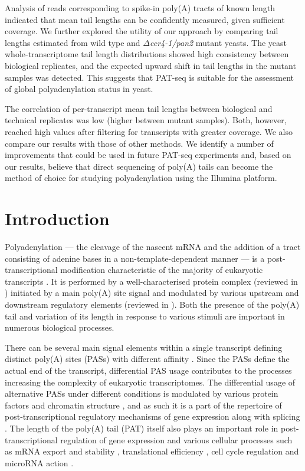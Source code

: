 \documentclass[10pt]{article}
\begin{document}
Analysis of reads corresponding to spike-in poly(A) tracts of known length indicated that mean tail lengths can be confidently measured, given sufficient coverage. We further explored the utility of our approach by comparing tail lengths estimated from wild type and \textit{$\Delta$ccr4-1/pan2} mutant yeasts. The yeast whole-transcriptome tail length distributions showed high consistency between biological replicates, and the expected upward shift in tail lengths in the mutant samples was detected. This suggests that PAT-seq is suitable for the assessment of global polyadenylation status in yeast.

The correlation of per-transcript mean tail lengths between biological and technical replicates was low (higher between mutant samples). Both, however, reached high values after filtering for transcripts with greater coverage. We also compare our results with those of other methods. We identify a number of improvements that could be used in future PAT-seq experiments and, based on our results, believe that direct sequencing of poly(A) tails can become the method of choice for studying polyadenylation using the Illumina platform.

\section*{Introduction}

Polyadenylation --- the cleavage of the nascent mRNA and the addition of a tract consisting of adenine bases in a non-template-dependent manner --- is a post-transcriptional modification characteristic of the majority of eukaryotic transcripts \cite{zhao99,elkon13,tian13}. It is performed by a well-characterised protein complex (reviewed in \cite{zhao99}) initiated by a main poly(A) site signal and modulated by various upstream and downstream regulatory elements (reviewed in \cite{tian11,weill12}). Both the presence of the poly(A) tail and variation of its length in response to various stimuli are important in numerous biological processes.

There can be several main signal elements within a single transcript defining distinct poly(A) sites (PASs) with different affinity \cite{tian13,elkon13}. Since the PASs define the actual end of the transcript, differential PAS usage contributes to the processes increasing the complexity of eukaryotic transcriptomes. The differential usage of alternative PASs under different conditions is modulated by various protein factors and chromatin structure \cite{tian13}, and as such it is a part of the repertoire of post-transcriptional regulatory mechanisms of gene expression along with splicing \cite{licatalosi10}. The length of the poly(A) tail (PAT) itself also plays an important role in post-transcriptional regulation of gene expression and various cellular processes such as mRNA export \cite{fuke07} and stability \cite{lackner07,eckmann11,weill12}, translational efficiency \cite{weill12}, cell cycle regulation \cite{mendez01} and microRNA action \cite{moretti12}.
\end{document}

